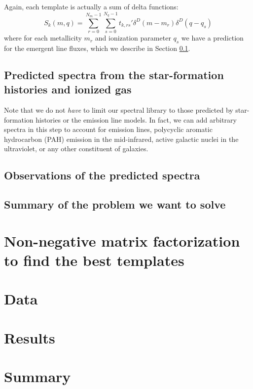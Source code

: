 \documentclass[10pt,preprint]{aastex}
\begin{document}
Again, each template is actually a sum of delta functions:
\begin{equation}
S_k(m, q) = 
\sum_{r=0}^{N_m-1} 
\sum_{s=0}^{N_q-1} 
t_{k,rs}'
\delta^D(m-m_r)
\delta^D(q-q_s)
\end{equation}
where for each metallicity $m_r$ and ionization parameter $q_s$ we 
have a prediction for the emergent line fluxes, which we describe in
Section \ref{spectra}. 




\subsection{Predicted spectra from the star-formation histories and
ionized gas}
\label{spectra}


Note that we do not {\it have} to limit our spectral library to those
predicted by star-formation histories or the emission line models. In
fact, we can add arbitrary spectra in this step to account for
emission lines, polycyclic aromatic hydrocarbon (PAH) emission in the
mid-infrared, active galactic nuclei in the ultraviolet, or any other
constituent of galaxies.

\subsection{Observations of the predicted spectra}
\label{observe}

\subsection{Summary of the problem we want to solve}
\label{problem}

\section{Non-negative matrix factorization to find the best templates}
\label{nmf}

\section{Data}
\label{data}

\section{Results}
\label{results}

\section{Summary}
\label{summary}
\end{document}
